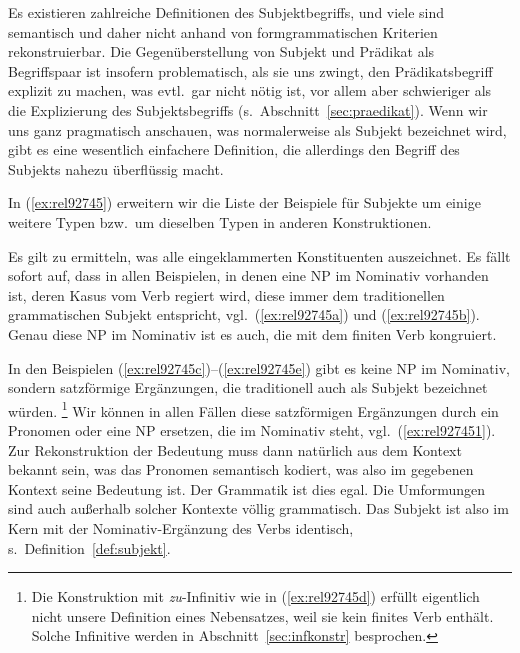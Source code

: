 Es existieren zahlreiche Definitionen des Subjektbegriffs, und viele sind semantisch und daher nicht anhand von formgrammatischen Kriterien rekonstruierbar.
Die Gegenüberstellung von Subjekt und Prädikat als Begriffspaar ist insofern problematisch, als sie uns zwingt, den Prädikatsbegriff explizit zu machen, was evtl.\ gar nicht nötig ist, vor allem aber schwieriger als die Explizierung des Subjektsbegriffs (s.\ Abschnitt~\ref{sec:praedikat}).
Wenn wir uns ganz pragmatisch anschauen, was normalerweise als Subjekt bezeichnet wird, gibt es eine wesentlich einfachere Definition, die allerdings den Begriff des Subjekts nahezu überflüssig macht.

In (\ref{ex:rel92745}) erweitern wir die Liste der Beispiele für Subjekte um einige weitere Typen bzw.\ um dieselben Typen in anderen Konstruktionen.

\begin{exe}
  \ex\label{ex:rel92745}
  \begin{xlist}
  \end{xlist}
\end{exe}

Es gilt zu ermitteln, was alle eingeklammerten Konstituenten auszeichnet.
Es fällt sofort auf, dass in allen Beispielen, in denen eine NP im Nominativ vorhanden ist, deren Kasus vom Verb regiert wird, diese immer dem traditionellen grammatischen Subjekt entspricht, vgl.\ (\ref{ex:rel92745a}) und (\ref{ex:rel92745b}).
Genau diese NP im Nominativ ist es auch, die mit dem finiten Verb kongruiert.

In den Beispielen (\ref{ex:rel92745c})--(\ref{ex:rel92745e}) gibt es keine NP im Nominativ, sondern satzförmige Ergänzungen, die traditionell auch als Subjekt bezeichnet würden.%
\footnote{Die Konstruktion mit \textit{zu}-Infinitiv wie in (\ref{ex:rel92745d}) erfüllt eigentlich nicht unsere Definition eines Nebensatzes, weil sie kein finites Verb enthält.
Solche Infinitive werden in Abschnitt~\ref{sec:infkonstr} besprochen.}
Wir können in allen Fällen diese satzförmigen Ergänzungen durch ein Pronomen oder eine NP ersetzen, die im Nominativ steht, vgl.\ (\ref{ex:rel927451}).
Zur Rekonstruktion der Bedeutung muss dann natürlich aus dem Kontext bekannt sein, was das Pronomen semantisch kodiert, was also im gegebenen Kontext seine Bedeutung ist.
Der Grammatik ist dies egal.
Die Umformungen sind auch außerhalb solcher Kontexte völlig grammatisch.
Das Subjekt ist also im Kern mit der Nominativ-Ergänzung des Verbs identisch, s.\ Definition~\ref{def:subjekt}.

